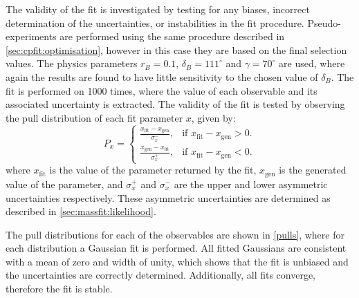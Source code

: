 The validity of the \CP fit is investigated by testing for any biases, incorrect determination of the uncertainties, or instabilities in the \CP fit procedure. Pseudo-experiments are performed using the same procedure described in \sect\ref{sec:cpfit:optimisation}, however in this case they are based on the final selection values. The physics parameters $r_B = 0.1$, $\delta_B = 111^{\circ}$ and $\gamma = 70^{\circ}$ are used, where again the results are found to have little sensitivity to the chosen value of $\delta_B$. The \CP fit is performed on 1000 times, where the value of each \CP observable and its associated uncertainty is extracted. The validity of the fit is tested by observing the pull distribution of each fit parameter $x$, given by:
\begin{equation*}
P_x = \begin{cases}
	\frac{x_{\text{fit}} - x_{\text{gen}}}{\sigma_x^-}, & \text{if } x_{\text{fit}} - x_{\text{gen}} > 0. \\
	\frac{x_{\text{gen}} - x_{\text{fit}}}{\sigma_x^+}, & \text{if } x_{\text{fit}} - x_{\text{gen}} < 0.
	\end{cases}
\end{equation*}
where $x_{\text{fit}}$ is the value of the parameter returned by the fit, $x_{\text{gen}}$ is the generated value of the parameter, and $\sigma_x^+$ and $\sigma_x^-$ are the upper and lower asymmetric uncertainties respectively. These asymmetric uncertainties are determined as described in \sect\ref{sec:massfit:likelihood}. 

The pull distributions for each of the \CP observables are shown in \fig\ref{pulls}, where for each distribution a Gaussian fit is performed. All fitted Gaussians are consistent with a mean of zero and width of unity, which shows that the \CP fit is unbiased and the uncertainties are correctly determined. Additionally, all fits converge, therefore the fit is stable. 

